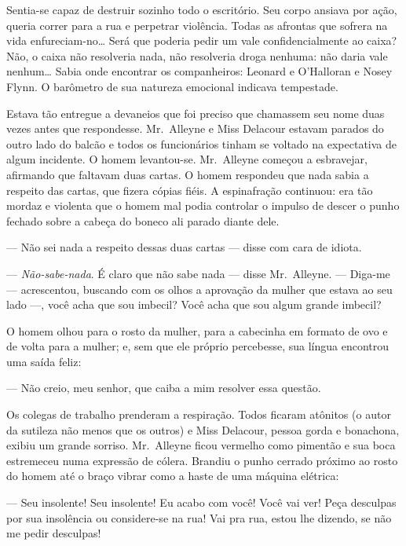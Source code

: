 Sentia-se capaz de destruir sozinho todo o escritório.  Seu corpo ansiava por
ação, queria correr para a rua e perpetrar violência.  Todas as afrontas que
sofrera na vida enfureciam-no\ldots{}  Será que poderia pedir um vale
confidencialmente ao caixa?  Não, o caixa não resolveria nada, não resolveria
droga nenhuma: não daria vale nenhum\ldots{} Sabia onde encontrar os
companheiros: Leonard e O’Halloran e Nosey Flynn.  O barômetro de sua natureza
emocional indicava tempestade.

Estava tão entregue a devaneios que foi preciso que chamassem seu nome duas
vezes antes que respondesse.  Mr.~Alleyne e Miss Delacour estavam parados do
outro lado do balcão e todos os funcionários tinham se voltado na expectativa
de algum incidente.  O homem levantou-se.  Mr.~Alleyne começou a esbravejar,
afirmando que faltavam duas cartas.  O homem respondeu que nada sabia a
respeito das cartas, que fizera cópias fiéis.  A espinafração continuou: era
tão mordaz e violenta que o homem mal podia controlar o impulso de descer o
punho fechado sobre a cabeça do boneco ali parado diante dele.

--- Não sei nada a respeito dessas duas cartas --- disse com cara de idiota.

--- \textit{Não-sabe-nada}.  É claro que não sabe nada --- disse Mr.~Alleyne.
--- Diga-me --- acrescentou, buscando com os olhos a aprovação da mulher que
estava ao seu lado ---, você acha que sou imbecil?  Você acha que sou algum
grande imbecil?

O homem olhou para o rosto da mulher, para a cabecinha em formato de ovo e de
volta para a mulher; e, sem que ele próprio percebesse, sua língua encontrou
uma saída feliz:

--- Não creio, meu senhor, que caiba a mim resolver essa questão.

Os colegas de trabalho prenderam a respiração.  Todos ficaram atônitos (o autor
da sutileza não menos que os outros) e Miss Delacour, pessoa gorda e bonachona,
exibiu um grande sorriso.  Mr.~Alleyne ficou vermelho como pimentão e sua boca
estremeceu numa expressão de cólera.  Brandiu o punho cerrado próximo ao rosto
do homem até o braço vibrar como a haste de uma máquina elétrica:

--- Seu insolente!  Seu insolente!  Eu acabo com você!  Você vai ver!  Peça
desculpas por sua insolência ou considere-se na rua!  Vai pra rua, estou lhe
dizendo, se não me pedir desculpas!

\smallskip

\noindent\dotfill

